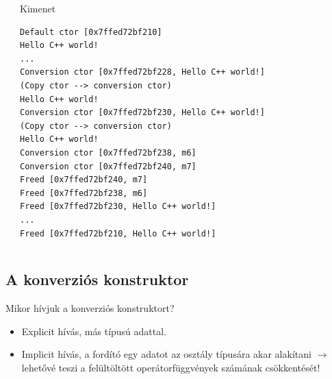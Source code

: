 \documentclass[usenames,dvipsnames,aspectratio=169]{beamer}
\begin{document}
\begin{frame}
    \begin{exampleblock}{}
        
    \end{exampleblock}
\end{frame}

\begin{frame}[fragile]
    \begin{columns}[T]
            \begin{exampleblock}{}
                \vspace{-.2cm}
                \scriptsize
                
                
                \vspace{-.2cm}
            \end{exampleblock}
            \begin{block}{Kimenet}
                \vspace{-.4cm}
                \begin{verbatim}
Default ctor [0x7ffed72bf210]
Hello C++ world!
...
Conversion ctor [0x7ffed72bf228, Hello C++ world!]
(Copy ctor --> conversion ctor)
Hello C++ world!
Conversion ctor [0x7ffed72bf230, Hello C++ world!]
(Copy ctor --> conversion ctor)
Hello C++ world!
Conversion ctor [0x7ffed72bf238, m6]
Conversion ctor [0x7ffed72bf240, m7]
Freed [0x7ffed72bf240, m7]
Freed [0x7ffed72bf238, m6]
Freed [0x7ffed72bf230, Hello C++ world!]
...
Freed [0x7ffed72bf210, Hello C++ world!]
\end{verbatim}             
                \vspace{-.4cm}
            \end{block}
    \end{columns}
\end{frame}

\subsection{A konverziós konstruktor}

\begin{frame}
    \hypertarget{subsection:conversion}{}
    Mikor hívjuk a konverziós konstruktort?
    \begin{itemize}
        \item Explicit hívás, más típusú adattal.
        \item Implicit hívás, a fordító egy adatot az osztály típusára akar alakítani $\to$ lehetővé teszi a felültöltött operátorfüggvények számának csökkentését!
    \end{itemize}
\end{frame}
\end{document}
